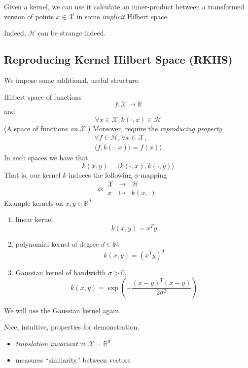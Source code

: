 Given a kernel, we can use it calculate an inner-product between a transformed version of points $x \in \mathcal{X}$ in some \emph{implicit} Hilbert space.

Indeed, $\mathcal{H}$ can be strange indeed.
\clearpage
\subsection*{Reproducing Kernel Hilbert Space (RKHS)}
We impose some additional, useful structure.

Hilbert space of functions
\begin{equation*}
f: \mathcal{X} \rightarrow \mathbb{R}
\end{equation*}
 and 
\begin{equation*}
\forall x \in \mathcal{X}, k(\cdot, x) \in \mathcal{H}
\end{equation*}
(A space of functions \emph{on} $\mathcal{X}$.)
\clearpage
Moreover,  require the \emph{reproducing property}
\begin{align*}
\forall f \in \mathcal{H}, \forall x \in \mathcal{X},\\
\langle f, k(\cdot,x)\rangle = f(x)\rangle
\end{align*}
In such spaces we have that 
\begin{equation*}
k(x,y) = \langle k(\cdot, x), k(\cdot, y) \rangle
\end{equation*}
\clearpage
That is, our kernel $k$ induces the following $\phi$-mapping
\begin{equation*}
\phi: \begin{matrix}
        \mathcal{X}  &\rightarrow &\mathcal{H}\\
        x &\mapsto &k(x,\cdot)
        \end{matrix}
\end{equation*}
\clearpage
Example kernels on $x, y \in \mathbb{R}^d$
\begin{enumerate}
\item linear kernel \[k(x, y) = x^Ty\]
\item polynomial kernel of degree $d\in \mathbb{N}$: \[k(x, y) = (x^Ty)^d\]
\item Gaussian kernel of bandwidth $\sigma>0$, \[k(x,y) = \exp\left(-\frac{(x-y)^T(x-y)}{2\sigma^2}\right)\]
\end{enumerate}
\clearpage
We will use the Gaussian kernel again.

Nice, intuitive, properties for demonstration.

\begin{itemize}
\item \emph{translation invariant} in $\mathcal{X}=\mathbb{R}^d$
\item measures ``similarity'' between vectors
\end{itemize}
\clearpage
